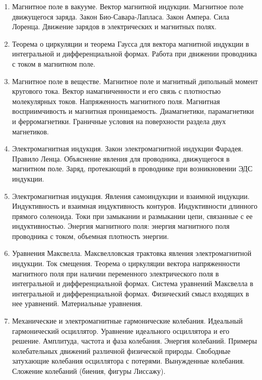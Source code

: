 \documentclass[12pt]{article}
\begin{document}
\begin{enumerate}

    \item Магнитное поле в вакууме. Вектор магнитной индукции. Магнитное поле движущегося 
    заряда. Закон Био-Савара-Лапласа. Закон Ампера. Сила Лоренца. Движение зарядов в 
    электрических и магнитных полях. 

    \item Теорема о циркуляции и теорема Гаусса для вектора магнитной индукции в интегральной и 
    дифференциальной формах. Работа при движении проводника с током в магнитном поле. 

    \item Магнитное поле в веществе. Магнитное поле и магнитный дипольный момент кругового тока. 
    Вектор намагниченности и его связь с плотностью молекулярных токов. Напряженность 
    магнитного поля. Магнитная восприимчивость и магнитная проницаемость. Диамагнетики, 
    парамагнетики и ферромагнетики. Граничные условия на поверхности раздела двух магнетиков. 

    \item Электромагнитная индукция. Закон электромагнитной индукции Фарадея. Правило Ленца. 
    Объяснение явления для проводника, движущегося в магнитном поле. Заряд, протекающий в 
    проводнике при возникновении ЭДС индукции. 

    \item Электромагнитная индукция. Явления самоиндукции и взаимной индукции. Индуктивность и 
    взаимная индуктивность контуров. Индуктивности длинного прямого соленоида. Токи при 
    замыкании и размыкании цепи, связанные с ее индуктивностью. Энергия магнитного поля: 
    энергия магнитного поля проводника с током, объемная плотность энергии.

    \item Уравнения Максвелла. Максвелловская трактовка явления электромагнитной индукции. Ток 
    смещения. Теорема о циркуляции вектора напряженности магнитного поля при наличии 
    переменного электрического поля в интегральной и дифференциальной формах. Система 
    уравнений Максвелла в интегральной и дифференциальной формах. Физический смысл 
    входящих в нее уравнений. Материальные уравнения.

    \item Механические и электромагнитные гармонические колебания. Идеальный гармонический 
    осциллятор. Уравнение идеального осциллятора и его решение. Амплитуда, частота и фаза 
    колебания. Энергия колебаний. Примеры колебательных движений различной физической 
    природы. Свободные затухающие колебания осциллятора с потерями. Вынужденные колебания. 
    Сложение колебаний (биения, фигуры Лиссажу). 


\end{enumerate}
\end{document}
